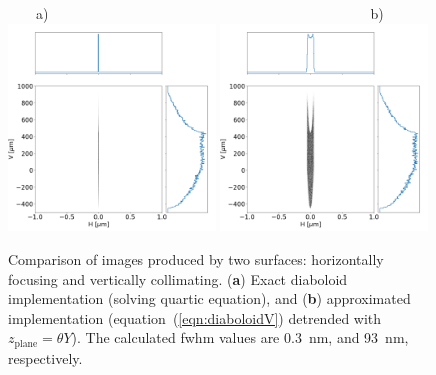 \documentclass[preprint]{iucr}       %
\begin{document}
\begin{figure}
\label{fig:pointToSegment}
\flushleft
~~~~a)~~~~~~~~~~~~~~~~~~~~~~~~~~~~~~~~~~~~~~~~~~~~~~b)\\
\centering
\includegraphics[width=0.49\textwidth]{figures/p2s_V_z.png}
\includegraphics[width=0.49\textwidth]{figures/p2s_K_z.png} \\
\flushleft
\caption{Comparison of images produced by two surfaces: horizontally focusing and vertically collimating. (\textbf{a}) Exact diaboloid implementation (solving quartic equation), and (\textbf{b}) approximated implementation (equation~(\ref{eqn:diaboloidV}) detrended with $z_\mathrm{plane}=\theta Y$). The calculated fwhm values are \SI{0.3}{\nano\meter}, and \SI{93}{\nano\meter}, respectively.}
\end{figure}
\end{document}
